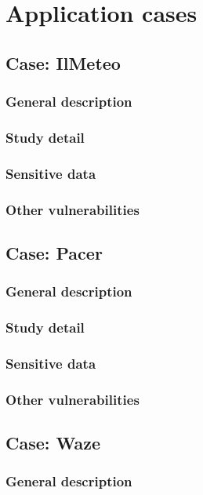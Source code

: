 \chapter{Application cases}
\label{chap:use_cases}

	\section{Case: IlMeteo}
		\subsection{General description}
		\subsection{Study detail}
		\subsection{Sensitive data}
		\subsection{Other vulnerabilities}

	\section{Case: Pacer}
	\label{sec:pacer}
		\subsection{General description}
		\subsection{Study detail}
		\subsection{Sensitive data}
		\subsection{Other vulnerabilities}

	\section{Case: Waze}
		\subsection{General description}
